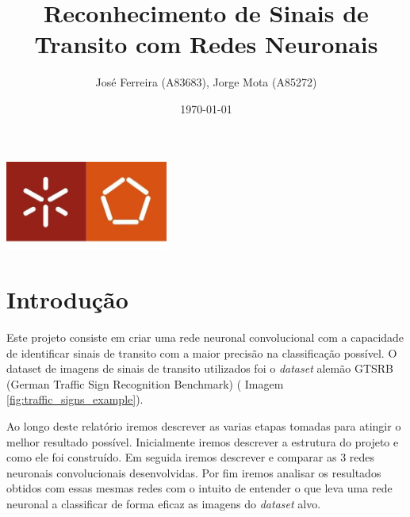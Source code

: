 \documentclass[a4paper]{report}
\begin{document}
\title{Reconhecimento de Sinais de Transito com Redes Neuronais}
\author{José Ferreira (A83683), Jorge Mota (A85272)}
\date{\today}

\begin{center}
    \begin{minipage}{0.75\linewidth}
        \centering
        \includegraphics[width=0.4\textwidth]{images/eng.jpeg}\par\vspace{1cm}
        \vspace{1.5cm}
        \href{https://www.uminho.pt/PT}
        {\color{black}{\scshape\LARGE Universidade do Minho}} \par
        \vspace{1cm}
        \href{https://www.di.uminho.pt/}
        {\color{black}{\scshape\Large Departamento de Informática}} \par
        \vspace{1.5cm}
        \maketitle
    \end{minipage}
\end{center}

\tableofcontents

\pagebreak
\chapter{Introdução}

Este projeto consiste em criar uma rede neuronal convolucional com a capacidade de
identificar sinais de transito com a maior precisão na classificação possível.
O dataset de imagens de sinais de transito utilizados foi o \textit{dataset} alemão
GTSRB (German Traffic Sign Recognition Benchmark) (
Imagem \ref{fig:traffic_signs_example}). 

Ao longo deste relatório iremos descrever as varias etapas tomadas para atingir o melhor
resultado possível. Inicialmente iremos descrever a estrutura do projeto e como ele foi
construído. Em seguida iremos descrever e comparar as 3 redes neuronais convolucionais
desenvolvidas. Por fim iremos analisar os resultados obtidos com essas mesmas redes com
o intuito de entender o que leva uma rede neuronal a classificar de forma eficaz as
imagens do \textit{dataset} alvo.
\newline
\end{document}
